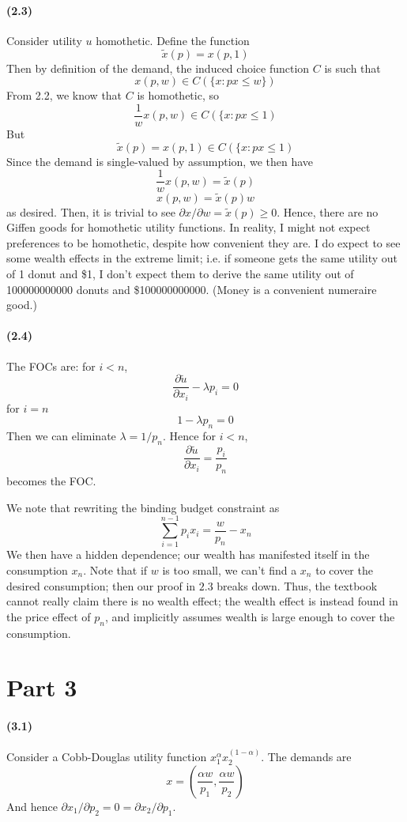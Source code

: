 \documentclass[10pt,letter]{article}
\begin{document}
\paragraph{(2.3)}
Consider utility $u$ homothetic. Define the function
\[ \tilde{x}(p) = x(p,1) \]
Then by definition of the demand, the induced choice function $C$ is such that
\[ x(p,w) \in C(\{ x : px \le w\}) \]
From 2.2, we know that $C$ is homothetic, so
\[ \frac{1}{w}x(p,w) \in C(\{ x: px \le 1) \]
But
\[ \tilde{x}(p) = x(p,1) \in C(\{ x: px \le 1) \]
Since the demand is single-valued by assumption, we then have
\[\frac{1}{w}x(p,w) = \tilde{x}(p) \]
\[ x(p,w) =\tilde{x}(p) w \]
as desired. Then, it is trivial to see $\partial x / \partial w = \tilde{x}(p) \ge 0$. Hence, there are no Giffen goods for homothetic utility functions. In reality, I might not expect preferences to be homothetic, despite how convenient they are. I do expect to see some wealth effects in the extreme limit; i.e. if someone gets the same utility out of 1 donut and \$1, I don't expect them to derive the same utility out of 100000000000 donuts and \$100000000000. (Money is a convenient numeraire good.)
\paragraph{(2.4)}
The FOCs are: for $i < n$,
\[ \frac{\partial \tilde{u}}{\partial x_i} - \lambda p_i = 0 \]
for $i = n$
\[ 1- \lambda p_n = 0 \]
Then we can eliminate $\lambda = 1/p_n$. Hence for $i < n$,
\[ \frac{\partial \tilde{u}}{\partial x_i} = \frac{p_i}{p_n} \]
becomes the FOC.

We note that rewriting the binding budget constraint as
\[ \sum_{i=1}^{n-1} p_ix_i = \frac{w}{p_n} - x_n \]
We then have a hidden dependence; our wealth has manifested itself in the consumption $x_n$. Note that if $w$ is too small, we can't find a $x_n$ to cover the desired consumption; then our proof in $2.3$ breaks down. Thus, the textbook cannot really claim there is no wealth effect; the wealth effect is instead found in the price effect of $p_n$, and implicitly assumes wealth is large enough to cover the consumption.

\pagebreak
\section*{Part 3}
\paragraph{(3.1)}
Consider a Cobb-Douglas utility function $x_1^\alpha x_2^{(1-\alpha)}$. The demands are
\[ x = \left( \frac{\alpha w}{p_1}, \frac{\alpha w}{p_2} \right) \]
And hence $\partial x_1 / \partial p_2 = 0 = \partial x_2 / \partial p_1$.
\end{document}
